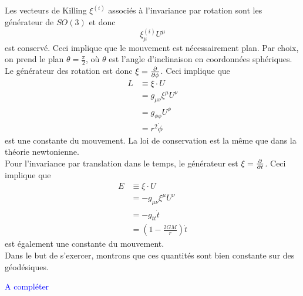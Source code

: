 \documentclass[a4paper,11pt]{report}
\theoremstyle{definition}
\theoremstyle{plain}
\theoremstyle{definition}
\theoremstyle{remark}
\newcommand{\comp}{\begin{center}\textcolor{blue}{A compléter}\end{center}}
\begin{document}
            Les vecteurs de Killing $\xi^{(i)}$ associés à l'invariance par rotation sont les générateur de $SO(3)$ et donc
            \begin{equation}
                \xi^{(i)}_\mu U^\mu
            \end{equation}
            est conservé. Ceci implique que le mouvement est nécessairement plan. Par choix, on prend le plan $\theta = \frac{\pi}{2}$, où $\theta$ est l'angle d'inclinaison en coordonnées sphériques. Le générateur des rotation est donc $\xi = \pdv{}{\phi}$. Ceci implique que
            \begin{align}
                L &\equiv \xi\cdot U \\
                &= g_{\mu\nu}\xi^\mu U^\nu\\
                &= g_{\phi\phi} U^\phi\\
                &= r^2\dot{\phi}
            \end{align}
            est une constante du mouvement. La loi de conservation est la même que dans la théorie newtonienne.\\
            
            Pour l'invariance par translation dans le temps, le générateur est $\xi = \pdv{}{t}$. Ceci implique que 
            \begin{align}
                E &\equiv \xi\cdot U\\
                &= -g_{\mu\nu}\xi^\mu U^\nu\\
                &= -g_{tt}\dot{t}\\
                &= \left( 1-\frac{2GM}{r} \right)\dot{t}
            \end{align}
            est également une constante du mouvement.\\
            
            Dans le but de s'exercer, montrons que ces quantités sont bien constante sur des géodésiques. 
            \comp
            
\end{document}
